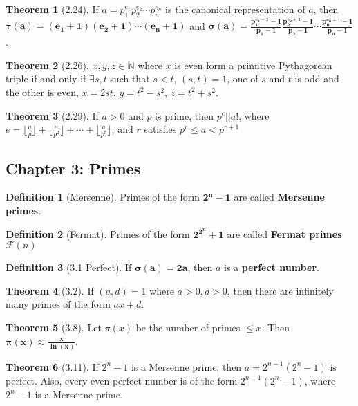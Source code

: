\documentclass{article}
\newcommand{\N}{\ensuremath{\mathbb{N}}}
\newcommand{\floor}[1]{\lfloor #1 \rfloor}
\newcommand{\Iff}{if and only if}
\newcommand{\script}[1]{\ensuremath{\mathscr{#1}}}
\theoremstyle{definition}
\newtheorem*{defn}{Definition}
\newtheorem*{thm}{Theorem}
\theoremstyle{remark}
\begin{document}
{        \begin{thm}[2.24]
            If $a=p_1^{e_1}p_2^{e_2}\cdots p_n^{e_n}$ is the canonical representation of $a$, then $\mathbf{\tau(a)=(e_1+1)(e_2+1)\cdots(e_n+1)}$ and $\mathbf{\sigma(a)=\frac{p_1^{e_1+1}-1}{p_1-1}\frac{p_2^{e_2+1}-1}{p_2-1}\cdots\frac{p_n^{e_n+1}-1}{p_n-1}}$.
        \end{thm}
        
        \begin{thm}[2.26]
            $x,y,z \in \N$ where $x$ is even form a primitive Pythagorean triple \Iff{} $\exists s,t$ such that $s<t$, $(s,t)=1$, one of $s$ and $t$ is odd and the other is even, $x=2st$, $y=t^2-s^2$, $z=t^2+s^2$.
        \end{thm}
        
        \begin{thm}[2.29]
            If $a>0$ and $p$ is prime, then $p^e||a!$, where $e=\floor{\frac{a}{p}}+\floor{\frac{a}{p^2}}+\cdots+\floor{\frac{a}{p^r}}$, and $r$ satisfies $p^r\leq a< p^{r+1}$
        \end{thm}
    }
    
    \subsection*{Chapter 3: Primes}{
        \begin{defn}[Mersenne]
            Primes of the form $\mathbf{2^n-1}$ are called \textbf{Mersenne primes}.
        \end{defn}
        
        \begin{defn}[Fermat]
            Primes of the form $\mathbf{2^{2^n}+1}$ are called \textbf{Fermat primes $\script{F}(n)$}
        \end{defn}
        
        \begin{defn}[3.1 Perfect]
            If $\mathbf{\sigma(a)=2a}$, then $a$ is a \textbf{perfect number}.
        \end{defn}
        
        \begin{thm}[3.2]
            If $(a,d)=1$ where $a>0, d>0$, then there are infinitely many primes of the form $ax+d$.
        \end{thm}
        
        \begin{thm}[3.8]
            Let $\pi(x)$ be the number of primes $\leq x$. Then $\mathbf{\pi(x) \approx \frac{x}{\ln(x)}}$.
        \end{thm}
        
        \begin{thm}[3.11]
            If $2^n-1$ is a Mersenne prime, then $a=2^{n-1}(2^n-1)$ is perfect. Also, every even perfect number is of the form $2^{n-1}(2^n-1)$, where $2^n-1$ is a Mersenne prime.
        \end{thm}
    }
    
\end{document}
